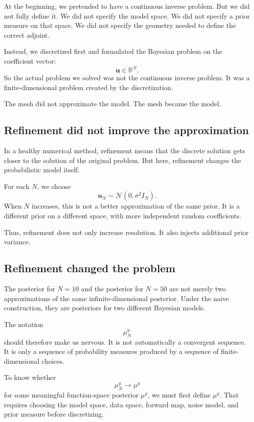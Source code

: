 \documentclass[11pt,a4paper]{book}
\newcommand{\post}{\mu^y}
\begin{document}
At the beginning, we pretended to have a continuous inverse problem. But we did
not fully define it. We did not specify the model space. We did not specify a
prior measure on that space. We did not specify the geometry needed to define
the correct adjoint.

Instead, we discretized first and formulated the Bayesian problem on the
coefficient vector:
\[
    \bm{u} \in \mathbb{R}^N.
\]
So the actual problem we solved was not the continuous inverse problem. It was a
finite-dimensional problem created by the discretization.

The mesh did not approximate the model. The mesh became the model.

\subsection{Refinement did not improve the approximation}

In a healthy numerical method, refinement means that the discrete solution gets
closer to the solution of the original problem. But here, refinement changes the
probabilistic model itself.

For each $N$, we choose
\[
    \bm{u}_N \sim \mathcal{N}(0,\sigma^2 I_N).
\]
When $N$ increases, this is not a better approximation of the same prior. It is
a different prior on a different space, with more independent random
coefficients.

Thus, refinement does not only increase resolution. It also injects additional
prior variance.

\subsection{Refinement changed the problem}

The posterior for $N=10$ and the posterior for $N=50$ are not merely two
approximations of the same infinite-dimensional posterior. Under the naive
construction, they are posteriors for two different Bayesian models.

The notation
\[
    \post_N
\]
should therefore make us nervous. It is not automatically a convergent sequence.
It is only a sequence of probability measures produced by a sequence of
finite-dimensional choices.

To know whether
\[
    \post_N \to \post
\]
for some meaningful function-space posterior $\post$, we must first define
$\post$. That requires choosing the model space, data space, forward map, noise
model, and prior measure before discretizing.
\end{document}
